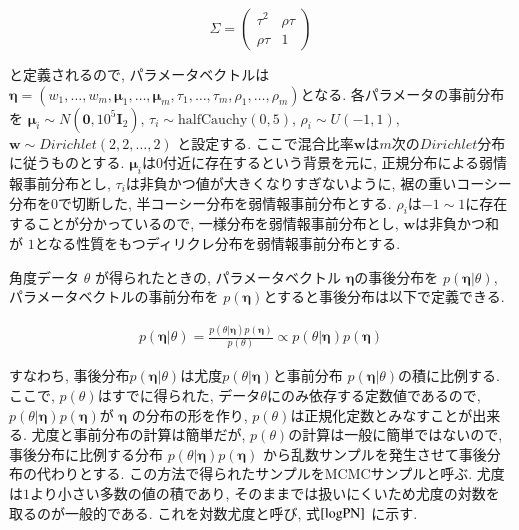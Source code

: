 \documentclass[a4j,11pt]{jarticle}
\begin{document}
\vspace{-1zh}
\[
 \Sigma = \left(
    \begin{array}{cc}
      \tau^2 & \rho \tau \\
      \rho \tau & 1
    \end{array}
  \right)
\]

\vspace{-0.5zh}
\noindent
と定義されるので, パラメータベクトルは$\bm \eta = (w_1, \dots, w_m, \bm \mu_1, \dots, \bm \mu_m, \tau_1, \dots, \tau_m, \rho_1, \dots, \rho_m)$となる. 各パラメータの事前分布を $\bm \mu_i \sim N(\bm 0, 10^5 \bm I_2)$, $\tau_i \sim \mathrm{half Cauchy}(0,5)$, $\rho_i \sim U(-1,1)$, $\bm w \sim Dirichlet(2,2, \dots, 2)$ と設定する. ここで混合比率$\bm w$は$m$次の$Dirichlet$分布に従うものとする. $\bm \mu_i$は$0$付近に存在するという背景を元に, 正規分布による弱情報事前分布とし, $\tau_i$は非負かつ値が大きくなりすぎないように, 裾の重いコーシー分布を$0$で切断した, 半コーシー分布を弱情報事前分布とする. $\rho_i$は$-1 \sim 1$に存在することが分かっているので, 一様分布を弱情報事前分布とし, $\bm w$は非負かつ和が $1$となる性質をもつディリクレ分布を弱情報事前分布とする.

角度データ $\theta$ が得られたときの, パラメータベクトル $\bm \eta$の事後分布を $p(\bm \eta| \theta)$, パラメータベクトルの事前分布を $p(\bm \eta)$とすると事後分布は以下で定義できる. 

\vspace{-1zh}
\begin{eqnarray*}
p(\bm \eta | \theta) = \frac{p(\theta | \bm \eta) p(\bm \eta)}{p(\theta)} \propto p(\theta | \bm \eta) p(\bm \eta)
\end{eqnarray*}

\vspace{-0.5zh}
\noindent
すなわち, 事後分布$p(\bm \eta | \theta)$は尤度$p(\theta | \bm \eta)$と事前分布 $p(\bm \eta| \theta)$の積に比例する. ここで, $p(\theta)$はすでに得られた, データ$\theta$にのみ依存する定数値であるので, $p(\theta | \bm \eta) p(\bm \eta)$が $\bm \eta$ の分布の形を作り, $p(\theta)$は正規化定数とみなすことが出来る. 尤度と事前分布の計算は簡単だが, $p(\theta)$の計算は一般に簡単ではないので, 事後分布に比例する分布 $p(\theta | \bm \eta) p(\bm \eta)$ から乱数サンプルを発生させて事後分布の代わりとする. この方法で得られたサンプルをMCMCサンプルと呼ぶ. 尤度は$1$より小さい多数の値の積であり, そのままでは扱いにくいため尤度の対数を取るのが一般的である. これを対数尤度と呼び, 式$\ref{logPN}$ に示す. 
\end{document}
